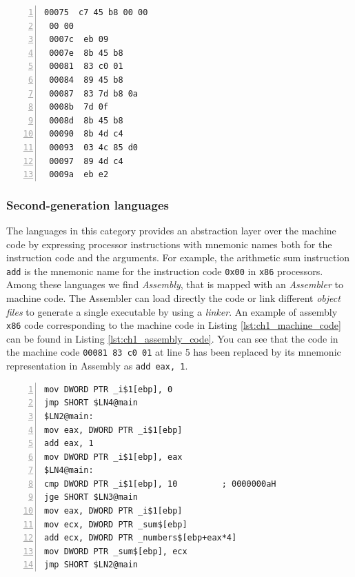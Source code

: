\begin{minipage}{\linewidth}
\begin{lstlisting}[numbers = left, caption = Machine code to compute the sum of a sequence of numbers, label = lst:ch1_machine_code]
 00075	c7 45 b8 00 00
 00 00
 0007c	eb 09	
 0007e	8b 45 b8
 00081	83 c0 01
 00084	89 45 b8
 00087	83 7d b8 0a
 0008b	7d 0f
 0008d	8b 45 b8
 00090	8b 4d c4
 00093	03 4c 85 d0
 00097	89 4d c4
 0009a	eb e2
\end{lstlisting}
\end{minipage}

\subsubsection*{Second-generation languages}
The languages in this category provides an abstraction layer over the machine code by expressing processor instructions with mnemonic names both for the instruction code and the arguments. For example, the arithmetic sum instruction \texttt{add} is the mnemonic name for the instruction code \texttt{0x00} in \texttt{x86} processors. Among these languages we find \textit{Assembly}, that is mapped with an \textit{Assembler} to machine code. The Assembler can load directly the code or link different \textit{object files} to generate a single executable by using a \textit{linker}. An example of assembly \texttt{x86} code corresponding to the machine code in Listing \ref{lst:ch1_machine_code} can be found in Listing \ref{lst:ch1_assembly_code}. You can see that the code in the machine code \texttt{00081	83 c0 01} at line 5 has been replaced by its mnemonic representation in Assembly as \texttt{add	eax, 1}.

\begin{minipage}{\linewidth}
\begin{lstlisting}[numbers = left, caption = Assembly x86 code to compute the sum of a sequence of numbers, label = lst:ch1_assembly_code]
mov	DWORD PTR _i$1[ebp], 0
jmp	SHORT $LN4@main
$LN2@main:
mov	eax, DWORD PTR _i$1[ebp]
add	eax, 1
mov	DWORD PTR _i$1[ebp], eax
$LN4@main:
cmp	DWORD PTR _i$1[ebp], 10			; 0000000aH
jge	SHORT $LN3@main
mov	eax, DWORD PTR _i$1[ebp]
mov	ecx, DWORD PTR _sum$[ebp]
add	ecx, DWORD PTR _numbers$[ebp+eax*4]
mov	DWORD PTR _sum$[ebp], ecx
jmp	SHORT $LN2@main
\end{lstlisting}
\end{minipage}


